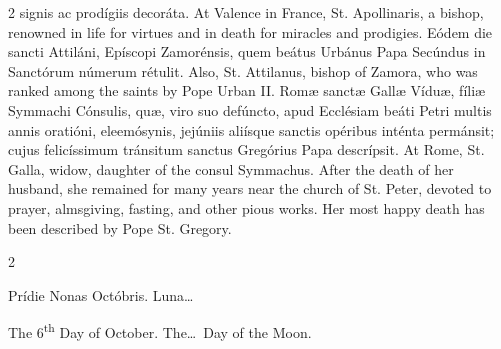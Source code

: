 \begin{paracol}{2}
 signis ac prodígiis decoráta.
\switchcolumn
{}
At Valence in France, St. 
 Apollinaris, a bishop, renowned in life for virtues and in death for 
 miracles and prodigies.
\switchcolumn*
{}
Eódem die sancti 
 Attiláni, Epíscopi Zamorénsis, quem beátus Urbánus Papa Secúndus in 
 Sanctórum númerum rétulit.
\switchcolumn
{}
Also, St. Attilanus, bishop of 
 Zamora, who was ranked among the saints by Pope Urban II.
\switchcolumn*
{}
Romæ sanctæ Gallæ Víduæ, 
 fíliæ Symmachi Cónsulis, quæ, viro suo defúncto, apud Ecclésiam beáti Petri 
 multis annis oratióni, eleemósynis, jejúniis aliísque sanctis opéribus 
 inténta permánsit; cujus felicíssimum tránsitum sanctus Gregórius Papa 
 descrípsit.
\switchcolumn
{}
At Rome, St. Galla, widow, daughter 
 of the consul Symmachus. After the death of her husband, she remained 
 for many years near the church of St. Peter, devoted to prayer, almsgiving, 
 fasting, and other pious works. Her most happy death has been 
 described by Pope St. Gregory.
\switchcolumn*
{}
\end{paracol}


\begin{paracol}{2}
\begin{center}{\color{gregoriocolor} Prídie Nonas Octóbris. 
 Luna\dots\ }\end{center}
\switchcolumn
{}
\begin{center}{\color{gregoriocolor} The   6\textsuperscript{th} Day of 
 October. The\dots\ Day of the Moon.}\end{center}
\end{paracol}

